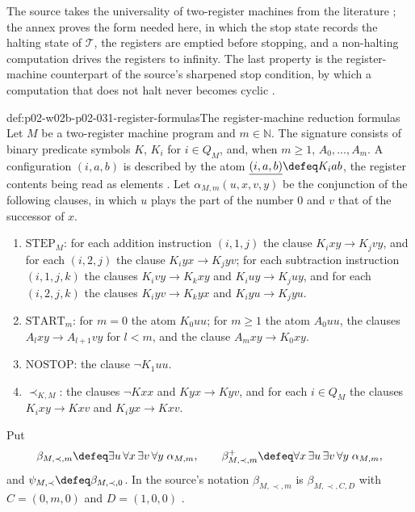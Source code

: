 The source takes the universality of two-register machines from the
literature \cite[Sect.~2.1.1, p.~28]{BorgerGradelGurevich1997}; the annex proves
the form needed here, in which the stop state records the halting state of
\(\mathcal T\), the registers are emptied before stopping, and a
non-halting computation drives the registers to infinity.  The last property
is the register-machine counterpart of the source's sharpened stop condition,
by which a computation that does not halt never becomes cyclic
\cite[Sect.~2.1.2, p.~35]{BorgerGradelGurevich1997}.

\begin{hbdefinition}{def:p02-w02b-p02-031-register-formulas}{The register-machine reduction formulas}
Let \(M\) be a two-register machine program and \(m\in\mathbb N\).  The
signature consists of binary predicate symbols \(K\), \(K_i\) for \(i\in
Q_M\), and, when \(m\geq1\), \(A_0,\ldots,A_m\).  A configuration
\((i,a,b)\) is described by the atom \(\underline{(i,a,b)}\defeq K_iab\), the
register contents being read as elements
\cite[Sect.~2.1.1, p.~28]{BorgerGradelGurevich1997}.  Let
\(\alpha_{M,m}(u,x,v,y)\) be the conjunction of the following clauses, in
which \(u\) plays the part of the number \(0\) and \(v\) that of the successor
of \(x\).
\begin{enumerate}
\item \(\mathrm{STEP}_M\): for each addition instruction \((i,1,j)\) the clause
      \(K_ixy\to K_jvy\), and for each \((i,2,j)\) the clause
      \(K_iyx\to K_jyv\); for each subtraction instruction \((i,1,j,k)\) the
      clauses \(K_ivy\to K_kxy\) and \(K_iuy\to K_juy\), and for each
      \((i,2,j,k)\) the clauses \(K_iyv\to K_kyx\) and \(K_iyu\to K_jyu\).
\item \(\mathrm{START}_m\): for \(m=0\) the atom \(K_0uu\); for \(m\geq1\) the
      atom \(A_0uu\), the clauses \(A_lxy\to A_{l+1}vy\) for \(l<m\), and the
      clause \(A_mxy\to K_0xy\).
\item \(\mathrm{NOSTOP}\): the clause \(\neg K_1uu\).
\item \(\prec_{K,M}\): the clauses \(\neg Kxx\) and \(Kyx\to Kyv\), and for
      each \(i\in Q_M\) the clauses \(K_ixy\to Kxv\) and \(K_iyx\to Kxv\).
\end{enumerate}
Put
\[
 \beta_{M,\prec,m}\defeq\exists u\,\forall x\,\exists v\,\forall y\;
   \alpha_{M,m},
 \qquad
 \beta^{+}_{M,\prec,m}\defeq\forall x\,\exists u\,\exists v\,\forall y\;
   \alpha_{M,m},
\]
and \(\psi_{M,\prec}\defeq\beta_{M,\prec,0}\).  In the source's notation
\(\beta_{M,\prec,m}\) is \(\beta_{M,\prec,C,D}\) with \(C=(0,m,0)\) and
\(D=(1,0,0)\) \cite[Sect.~2.1.2, p.~36]{BorgerGradelGurevich1997}.
\end{hbdefinition}

